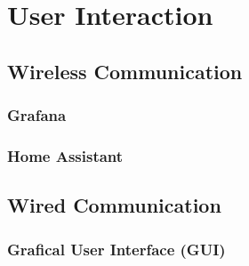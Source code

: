 \section{User Interaction}

\subsection{Wireless Communication}


\subsubsection{Grafana}

\subsubsection{Home Assistant}

\subsection{Wired Communication}


\subsubsection{Grafical User Interface (GUI) }


